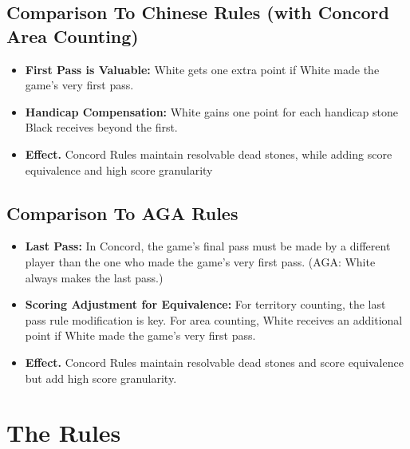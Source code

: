 \documentclass[11pt]{article}
\begin{document}
\subsection*{Comparison To Chinese Rules (with Concord Area Counting)}
    \begin{itemize}
    \item \textbf{First Pass is Valuable:} White gets one extra point if White made the game's very first pass.
    \item \textbf{Handicap Compensation:} White gains one point for each handicap stone Black receives beyond the first.
    \item \textbf{Effect.} Concord Rules maintain resolvable dead stones, while adding score equivalence and high score granularity
    \end{itemize}
\subsection*{Comparison To AGA Rules}
    \begin{itemize}
    \item \textbf{Last Pass:} In Concord, the game's final pass must be made by a different player than the one who made the game's very first pass.
    (AGA: White always makes the last pass.)
    \item \textbf{Scoring Adjustment for Equivalence:} For territory counting, the last pass rule modification is key.
    For area counting, White receives an additional point if White made the game's very first pass.
    \item \textbf{Effect.} Concord Rules maintain resolvable dead stones and score equivalence but add high score granularity.
    \end{itemize}


\newpage
\section*{The Rules}
\end{document}
